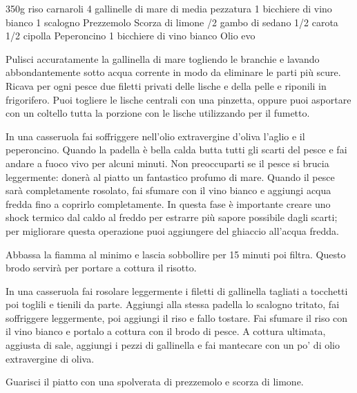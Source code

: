 \begin{ingreds}
	350g riso carnaroli
	4 gallinelle di mare di media pezzatura
	1 bicchiere di vino bianco
	1 scalogno
	Prezzemolo
	Scorza di limone
\columnbreak
{}/2 gambo di sedano
	1/2 carota
	1/2 cipolla
	Peperoncino
	1 bicchiere di vino bianco
	Olio evo 

\end{ingreds}

\begin{method}
	Pulisci accuratamente la gallinella di mare togliendo le branchie e lavando abbondantemente sotto acqua corrente in modo da eliminare le parti più scure. Ricava per ogni pesce due filetti privati delle lische e della pelle e riponili in frigorifero. Puoi togliere le lische centrali con una pinzetta, oppure puoi  asportare con un coltello tutta la porzione con le lische utilizzando per il fumetto.

	In una casseruola fai soffriggere nell'olio extravergine d’oliva l'aglio e il peperoncino. Quando la padella è bella calda butta tutti gli scarti del pesce e fai andare a fuoco vivo per alcuni minuti. Non preoccuparti se il pesce si brucia leggermente: donerà al piatto un fantastico profumo di mare. Quando il pesce sarà completamente rosolato, fai sfumare con il vino bianco e aggiungi acqua fredda fino a coprirlo completamente. In questa fase è importante creare uno shock termico dal caldo al freddo per estrarre più sapore possibile dagli scarti; per migliorare questa operazione puoi aggiungere del ghiaccio all'acqua fredda.
	
	Abbassa la fiamma al minimo e lascia sobbollire per 15 minuti poi filtra. Questo brodo servirà per portare a cottura il risotto.

	In una casseruola fai rosolare leggermente i filetti di gallinella tagliati a tocchetti poi toglili e tienili da parte. Aggiungi alla stessa padella lo scalogno tritato, fai soffriggere leggermente, poi aggiungi il riso e fallo tostare. Fai sfumare il riso con il vino bianco e portalo a cottura con il brodo di pesce. A cottura ultimata, aggiusta di sale, aggiungi i pezzi di gallinella e fai mantecare con un po’ di olio extravergine di oliva.

	Guarisci il piatto con una spolverata di prezzemolo e scorza di limone.

\end {method}

